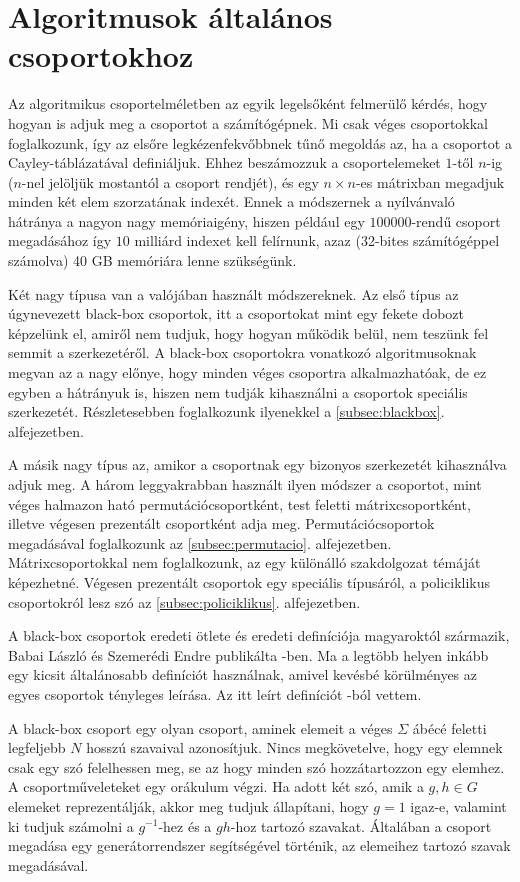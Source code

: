 \section{Algoritmusok általános csoportokhoz}
\label{sec:blackbox}
Az algoritmikus csoportelméletben az egyik legelsőként felmerülő kérdés, hogy hogyan is adjuk meg
a csoportot a számítógépnek.
Mi csak véges csoportokkal foglalkozunk, így az elsőre legkézenfekvőbbnek tűnő megoldás az, ha a
csoportot a Cayley-táblázatával definiáljuk.
Ehhez beszámozzuk a csoportelemeket $1$-től $n$-ig ($n$-nel jelöljük mostantól a csoport rendjét),
és egy $n\times n$-es mátrixban megadjuk minden két elem szorzatának indexét.
Ennek a módszernek a nyílvánvaló hátránya a nagyon nagy memóriaigény,
hiszen például egy $100000$-rendű csoport megadásához így $10$ milliárd indexet kell felírnunk,
azaz (32-bites számítógéppel számolva) 40 GB memóriára lenne szükségünk.

Két nagy típusa van a valójában használt módszereknek.
Az első típus az úgynevezett black-box csoportok, itt a csoportokat mint egy fekete dobozt képzelünk el,
amiről nem tudjuk, hogy hogyan működik belül, nem teszünk fel semmit a szerkezetéről.
A black-box csoportokra vonatkozó algoritmusoknak megvan az a nagy előnye, hogy minden véges csoportra
alkalmazhatóak, de ez egyben a hátrányuk is, hiszen nem tudják kihasználni a csoportok speciális szerkezetét.
Részletesebben foglalkozunk ilyenekkel a \ref{subsec:blackbox}. alfejezetben.

A másik nagy típus az, amikor a csoportnak egy bizonyos szerkezetét kihasználva adjuk meg.
A három leggyakrabban használt ilyen módszer a csoportot, mint véges halmazon ható permutációcsoportként,
test feletti mátrixcsoportként, illetve végesen prezentált csoportként adja meg.
Permutációcsoportok megadásával foglalkozunk az \ref{subsec:permutacio}. alfejezetben.
Mátrixcsoportokkal nem foglalkozunk, az egy különálló szakdolgozat témáját képezhetné.
Végesen prezentált csoportok egy speciális típusáról, a policiklikus csoportokról lesz szó
az \ref{subsec:policiklikus}. alfejezetben.

A black-box csoportok eredeti ötlete és eredeti definíciója magyaroktól származik,
Babai László és Szemerédi Endre publikálta \cite{BS84}-ben.
Ma a legtöbb helyen inkább egy kicsit általánosabb definíciót használnak, amivel kevésbé körülményes az
egyes csoportok tényleges leírása. Az itt leírt definíciót \cite{Ser03}-ból vettem.

A black-box csoport egy olyan csoport,
aminek elemeit a véges $\Sigma$ ábécé feletti legfeljebb $N$ hosszú szavaival azonosítjuk.
Nincs megkövetelve, hogy egy elemnek csak egy szó felelhessen meg, se az hogy minden szó hozzátartozzon
egy elemhez.
A csoportműveleteket egy orákulum végzi.
Ha adott két szó, amik a $g, h\in G$ elemeket reprezentálják,
akkor meg tudjuk állapítani, hogy $g=1$ igaz-e,
valamint ki tudjuk számolni a $g^{-1}$-hez és a $gh$-hoz tartozó szavakat.
Általában a csoport megadása egy generátorrendszer segítségével történik, az elemeihez tartozó szavak megadásával.

